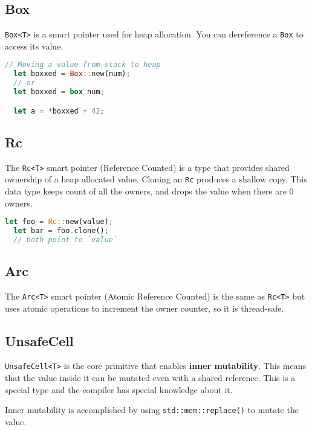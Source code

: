 \documentclass[a4paper]{article}
\begin{document}
\subsection{Box}

\texttt{Box<T>} is a smart pointer used for heap allocation.
You can dereference a \texttt{Box} to access its value.

\begin{lstlisting}[language=Rust, style=boxed, numbers=none]
  // Moving a value from stack to heap
  let boxxed = Box::new(num);
  // or
  let boxxed = box num;

  let a = *boxxed + 42;
\end{lstlisting}

\subsection{Rc}

The \texttt{Rc<T>} smart pointer (Reference Counted) is a type that provides
shared ownership of a heap allocated value. Cloning an \texttt{Rc} produces a shallow copy.
This data type keeps count of all the owners, and drops the value when there are 0 owners.

\begin{lstlisting}[language=Rust, style=boxed, numbers=none]
  let foo = Rc::new(value);
  let bar = foo.clone();
  // both point to `value`
\end{lstlisting}

\subsection{Arc}

The \texttt{Arc<T>} smart pointer (Atomic Reference Counted) is the same as \texttt{Rc<T>}
but uses atomic operations to increment the owner counter, so it is thread-safe.

\subsection{UnsafeCell}

\texttt{UnsafeCell<T>} is the core primitive that enables
\textbf{inner mutability}. This means that the value inside it can be
mutated even with a shared reference. This is a special type and the compiler
has special knowledge about it.

Inner mutability is accomplished by using \texttt{std::mem::replace()}
to mutate the value.
\end{document}
